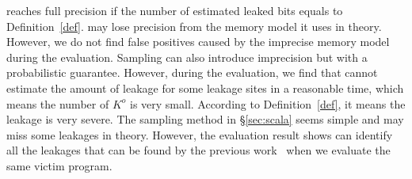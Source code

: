 \tool{} reaches full precision if the number of estimated leaked bits 
equals to Definition~\ref{def}. 
\tool{} may lose precision from the 
memory model it uses in theory. However, we do not find false positives 
caused by the imprecise memory model during the evaluation. 
Sampling can also introduce imprecision but with a probabilistic guarantee. 
However, during the evaluation, we find that \tool{} cannot estimate 
the amount of leakage for some leakage sites in a reasonable time, 
which means the number of $K^o$ is very small. According to Definition~\ref{def}, 
it means the leakage is very severe. The sampling method in \S\ref{sec:scala} seems
simple and may miss some leakages in theory. However, the evaluation result 
shows \tool{} can identify all the leakages that can be found by the previous work~\cite{203878,236338,Brotzman19Casym}
when we evaluate the same victim program.

